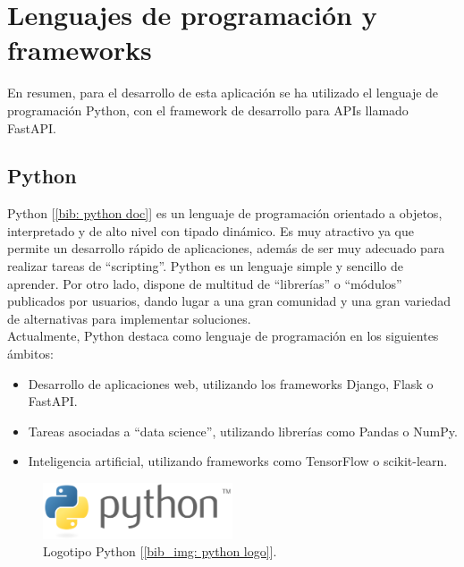 \documentclass[a4paper, oneside, 12pt]{book}
\begin{document}
	\pagebreak
	
	\section[Lenguajes y frameworks]{Lenguajes de programación y frameworks}
	
	\noindent En resumen, para el desarrollo de esta aplicación se ha utilizado el lenguaje de programación Python, con el framework de desarrollo para APIs llamado FastAPI.
	
	\subsection{Python}
	
	\noindent Python [\ref{bib: python doc}] es un lenguaje de programación orientado a objetos, interpretado y de alto nivel con tipado dinámico. Es muy atractivo ya que permite un desarrollo rápido de aplicaciones, además de ser muy adecuado para realizar tareas de ``scripting''. Python es un lenguaje simple y sencillo de aprender. Por otro lado, dispone de multitud de ``librerías'' o ``módulos'' publicados por usuarios, dando lugar a una gran comunidad y una gran variedad de alternativas para implementar soluciones. \\
	
	\noindent Actualmente, Python destaca como lenguaje de programación en los siguientes ámbitos:
	\begin{itemize}
		\item Desarrollo de aplicaciones web, utilizando los frameworks Django, Flask o FastAPI.
		\item Tareas asociadas a ``data science'', utilizando librerías como Pandas o NumPy.
		\item Inteligencia artificial, utilizando frameworks como TensorFlow o scikit-learn.
	\end{itemize}
	
	\begin{figure}[h!]
		\begin{center}
			\includegraphics[width=0.5\textwidth]{img/python_logo.png}
			\caption{Logotipo Python [\ref{bib_img: python logo}].}
			\label{img: python logo}
		\end{center}
	\end{figure}
	
\end{document}
